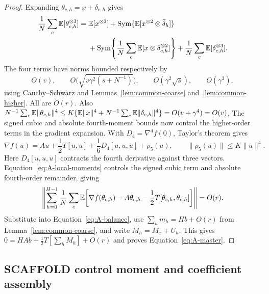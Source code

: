 \begin{proof}
Expanding $\theta_{c,h}=x+\delta_{c,h}$ gives
\begin{align*}
 \frac1N\sum_c\mathbb{E}[\theta_{c,h}^{\otimes3}]
 ={}&\mathbb{E}[x^{\otimes3}]+\operatorname{Sym}\{\mathbb{E}[x^{\otimes2}\otimes\bar\delta_h]\}\\
 &+\operatorname{Sym}\!\left\{\frac1N\sum_c\mathbb{E}[x\otimes\delta_{c,h}^{\otimes2}]\right\}
 +\frac1N\sum_c\mathbb{E}[\delta_{c,h}^{\otimes3}].
\end{align*}
The four terms have norms bounded respectively by
\[
 O(v),\qquad O\bigl(\sqrt{v\gamma^2(s+N^{-1})}\bigr),\qquad
 O(\gamma^2\sqrt{s}),\qquad O(\gamma^3),
\]
using Cauchy--Schwarz and Lemmas~\ref{lem:common-coarse}
and~\ref{lem:common-higher}. All are $O(r)$.
Also $N^{-1}\sum_c\mathbb{E}\|\theta_{c,h}\|^4
\le K\{\mathbb{E}\|x\|^4+N^{-1}\sum_c\mathbb{E}\|\delta_{c,h}\|^4\}
=O(v+\gamma^4)=O(v)$.
The signed cubic and absolute fourth-moment bounds now control the
higher-order terms in the gradient expansion. With
$D_4=\nabla^4f(0)$, Taylor's theorem gives
\begin{equation}
\label{eq:A-Taylor}
 \nabla f(u)=Au+\frac12T[u,u]+\frac16D_4[u,u,u]+\rho_5(u),\qquad
 \|\rho_5(u)\|\le K\|u\|^4.
\end{equation}
Here $D_4[u,u,u]$ contracts the fourth derivative against three vectors.
Equation~\eqref{eq:A-local-moments} controls the signed cubic term and
absolute fourth-order remainder, giving
\begin{equation}
\label{eq:A-Taylor-tail}
 \left\|\sum_{h=0}^{H-1}\frac1N\sum_c
 \mathbb{E}\!\left[\nabla f(\theta_{c,h})-A\theta_{c,h}
             -\frac12T[\theta_{c,h},\theta_{c,h}]\right]\right\|=O(r).
\end{equation}
Substitute into Equation~\eqref{eq:A-balance}, use
$\sum_hm_h=Hb+O(r)$ from Lemma~\ref{lem:common-coarse}, and write
$M_h=M_x+U_h$. This gives
$0=HAb+\frac12T[\sum_hM_h]+O(r)$ and proves
Equation~\eqref{eq:A-master}.
\end{proof}

\subsection{SCAFFOLD control moment and coefficient assembly}
\label{app:scaf-assembly}

